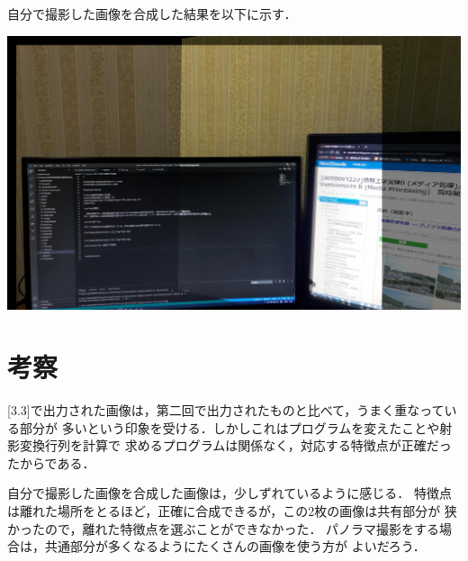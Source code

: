 \documentclass[11pt]{jarticle}
\begin{document}
自分で撮影した画像を合成した結果を以下に示す．

\includegraphics[scale=.1]{./img/tesktop.jpg}

\section{考察}

[3.3]で出力された画像は，第二回で出力されたものと比べて，うまく重なっている部分が
多いという印象を受ける．しかしこれはプログラムを変えたことや射影変換行列を計算で
求めるプログラムは関係なく，対応する特徴点が正確だったからである．

自分で撮影した画像を合成した画像は，少しずれているように感じる．
特徴点は離れた場所をとるほど，正確に合成できるが，この2枚の画像は共有部分が
狭かったので，離れた特徴点を選ぶことができなかった．
パノラマ撮影をする場合は，共通部分が多くなるようにたくさんの画像を使う方が
よいだろう．
\end{document}
